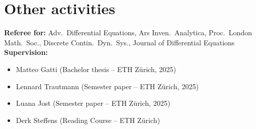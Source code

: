 \documentclass[a4paper,11pt]{article}
\begin{document}
\section*{Other activities}
\noindent
\textbf{Referee for:} Adv.\ Differential Equations, Ars Inven.\ Analytica, Proc.\ London Math.\ Soc., Discrete Contin.\ Dyn.\ Sys., Journal of Differential Equations\\
 
\noindent
\textbf{Supervision:} 
\begin{itemize}
	\item Matteo Gatti (Bachelor thesis -- ETH Z\"urich, 2025)
	\item Lennard Trautmann (Semester paper -- ETH Z\"urich, 2025)
	\item Luana Jost (Semester paper -- ETH Z\"urich, 2025)
	\item Derk Steffens (Reading Course -- ETH Z\"urich)
\end{itemize}
\vspace{5mm}
\end{document}
